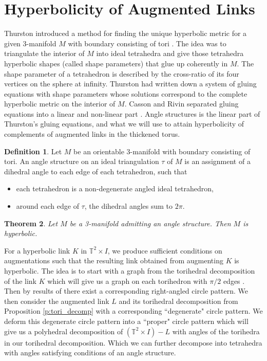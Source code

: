 \documentclass[11pt]{amsart}
\newcommand{\torus}{{\mathbb{T}^2}}
\theoremstyle{plain}
\newtheorem{theorem}{Theorem}[section]
\theoremstyle{definition}
\newtheorem{define}[theorem]{Definition}
\begin{document}
\section{Hyperbolicity of Augmented Links}
Thurston introduced a method for finding the unique hyperbolic metric for a given 3-manifold $M$ with boundary consisting of tori \cite{Thurston}. The idea was to triangulate the interior of $M$ into ideal tetrahedra and give those tetrahedra hyperbolic shapes (called shape parameters) that glue up coherently in $M$. The shape parameter of a tetrahedron is described by the cross-ratio of its four vertices on the sphere at infinity. Thurston had written down a system of gluing equations with shape parameters whose solutions correspond to the complete hyperbolic metric on the interior of $M$. Casson and Rivin separated gluing equations into a linear and non-linear part \cite{Casson-Rivin}. Angle structures is the linear part of Thurston's gluing equations, and what we will use to attain hyperbolicity of complements of augmented links in the thickened torus. 

\begin{define}
Let $M$ be an orientable 3-manifold with boundary consisting of tori. An angle
structure on an ideal triangulation $\tau$ of $M$ is an assignment of a dihedral
angle to each edge of each tetrahedron, such that
\begin{itemize}
\item each tetrahedron is a non-degenerate angled ideal tetrahedron,
\item around each edge of $\tau$, the dihedral angles sum to $2\pi$.
\end{itemize}
\end{define}

\begin{theorem}\cite{Casson-Rivin}\label{thm:Casson-Rivin}
Let $M$ be a 3-manifold admitting an angle structure. Then $M$ is hyperbolic.
\end{theorem}

For a hyperbolic link $K$ in $\torus \times I$, we produce sufficient conditions
on augmentations such that the resulting link obtained from augmenting $K$ is
hyperbolic. The idea is to start with a graph from the torihedral decomposition
of the link $K$ which will give us a graph on each torihedron with $\pi/2$ edges
\cite{CKP2}. Then by results of \cite{BandS} there exist a corresponding
right-angled circle pattern. We then consider the augmented link $L$ and its
torihedral decomposition from Proposition \ref{p:tori_decomp} with a
corresponding ``degenerate" circle pattern. We deform this degenerate circle
pattern into a ``proper" circle pattern which will give us a polyhedral
decomposition of $(\torus \times I)-L$ with angles of the torihedra in our
torihedral decomposition. Which we can further decompose into tetrahedra with
angles satisfying conditions of an angle structure. 
\end{document}
